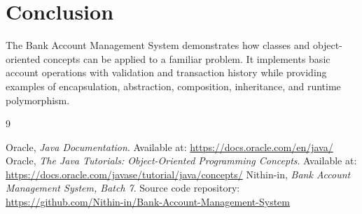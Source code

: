 \documentclass[11pt,a4paper]{report}
\begin{document}
\section{Conclusion}
The Bank Account Management System demonstrates how classes and object-oriented concepts can be applied to a familiar problem. It implements basic account operations with validation and transaction history while providing examples of encapsulation, abstraction, composition, inheritance, and runtime polymorphism.

\renewcommand{\bibname}{References}
\begin{thebibliography}{9}
 Oracle, \textit{Java Documentation}. Available at: \url{https://docs.oracle.com/en/java/}
 Oracle, \textit{The Java Tutorials: Object-Oriented Programming Concepts}. Available at: \url{https://docs.oracle.com/javase/tutorial/java/concepts/}
 Nithin-in, \textit{Bank Account Management System, Batch 7}. Source code repository: \url{https://github.com/Nithin-in/Bank-Account-Management-System}
\end{thebibliography}
\end{document}
